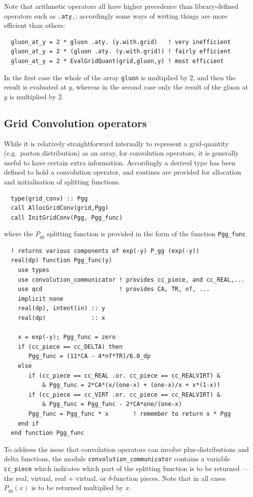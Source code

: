 \documentclass[12pt]{article}
\begin{document}
Note that arithmetic operators all have higher precedence than
library-defined operators such as \texttt{.aty.}; accordingly some
ways of writing things are more efficient than others:
\begin{verbatim}
  gluon_at_y = 2 * gluon .aty. (y.with.grid)   ! very inefficient
  gluon_at_y = 2 * (gluon .aty. (y.with.grid)) ! fairly efficient
  gluon_at_y = 2 * EvalGridQuant(grid,gluon,y) ! most efficient
\end{verbatim}
In the first case the whole of the array \texttt{gluon} is multiplied
by 2, and then the result is evaluated at $y$, whereas in the second
case only the result of the gluon at $y$ is multiplied by 2.

\subsection{Grid Convolution operators}
\label{sec:conv}

While it is relatively straightforward internally to represent a
grid-quantity (e.g.\ parton distribution) as an array, for convolution
operators, it is generally useful to have certain extra
information. Accordingly a derived type has been defined to hold a
convolution operator, and routines are provided for allocation and
initialisation of splitting functions.
\begin{verbatim}
  type(grid_conv) :: Pgg
  call AllocGridConv(grid,Pgg)
  call InitGridConv(Pgg, Pgg_func)
\end{verbatim}
where the $P_{gg}$ splitting function is provided in the form of the
function \texttt{Pgg\_func}
\begin{verbatim}
  ! returns various components of exp(-y) P_gg (exp(-y))
  real(dp) function Pgg_func(y)
    use types
    use convolution_communicator ! provides cc_piece, and cc_REAL,...
    use qcd                      ! provides CA, TR, nf, ...
    implicit none
    real(dp), intent(in) :: y
    real(dp)             :: x

    x = exp(-y); Pgg_func = zero
    if (cc_piece == cc_DELTA) then 
       Pgg_func = (11*CA - 4*nf*TR)/6.0_dp
    else
       if (cc_piece == cc_REAL .or. cc_piece == cc_REALVIRT) & 
           & Pgg_func = 2*CA*(x/(one-x) + (one-x)/x + x*(1-x))
       if (cc_piece == cc_VIRT .or. cc_piece == cc_REALVIRT) & 
           & Pgg_func = Pgg_func - 2*CA*one/(one-x)
       Pgg_func = Pgg_func * x       ! remember to return x * Pgg
    end if
  end function Pgg_func
\end{verbatim}
To address the issue that convolution operators can involve
plus-distributions and delta functions, the module
\texttt{convolution\_communicator} contains a variable
\texttt{cc\_piece} which indicates which part of the splitting
function is to be returned --- the real, virtual, real + virtual, or
$\delta$-function pieces. Note that in all cases $P_{gg}(x)$ is to be
returned multiplied by $x$.
\end{document}
